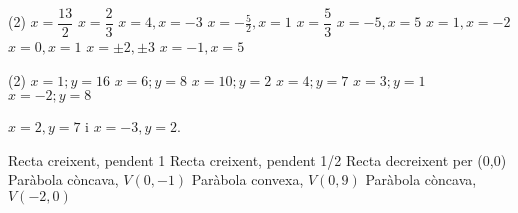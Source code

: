 \documentclass{article}
\let\ofrac\frac
\let\frac\dfrac
\begin{document}
\begin{multicols}{2}
\begin{mylist}
\item \begin{tasks}(2)
	\task $x=\frac{13}{2}$
	\task $x=\frac{2}{3}$
	\task $x=4, x=-3$
	\task $x=-\ofrac{5}{2}, x=1$
	\task $x=\frac{5}{3}$
	\task $x=-5, x=5$
	\task $x=1, x=-2$
	\task $x=0, x=1$
	\task $x=\pm 2, \pm 3$
	\task $x=-1, x=5$
\end{tasks}

\item
\begin{tasks}(2)
	\task $x=1; y=16$     \task $x=6; y=8$     \task $x=10; y=2$     \task $x=4; y=7$    \task $x=3; y=1$   \task  $x=-2; y=8$
\end{tasks}

\item $x=2, y=7$ i $x=-3, y=2$.

\item 

\begin{tasks}
	\task Recta creixent, pendent 1
	\task Recta creixent, pendent 1/2
	\task Recta decreixent per (0,0)
	\task Paràbola còncava, $V(0,-1)$
	\task Paràbola convexa, $V(0,9)$
	\task Paràbola còncava, $V(-2, 0)$
\end{tasks}	
\end{mylist}
  \end{multicols}
\vspace{-1cm}
\end{document}
